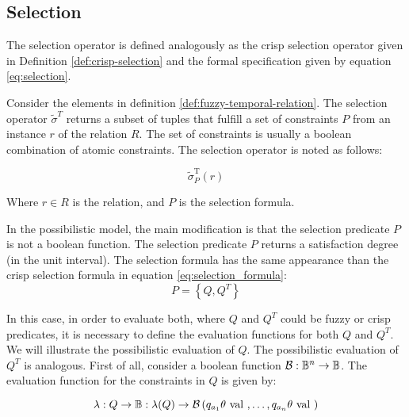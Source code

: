 \subsection{\label{subsection:fuzzy-selection}Selection}
The selection operator is defined analogously as the crisp selection operator given in Definition \ref{def:crisp-selection} and the formal specification given by equation \eqref{eq:selection}. 


\begin{definition}
\label{def:poss-selection}
 Consider the elements in definition \ref{def:fuzzy-temporal-relation}.
The selection operator $\tilde\sigma^{T}$ returns a subset of tuples that fulfill a set of constraints $P$ from an instance $r$ of the relation $R$. The set of constraints is usually a boolean combination of atomic constraints. The selection operator is noted as follows:
\end{definition}

\begin{equation}
 \label{eq:poss-selection}
\tilde\sigma^{\mbox{T}}_{P} \left( r \right)
\end{equation}

Where $r \in R$ is the relation, and $P$ is the selection formula. 


In the possibilistic model, the main modification is that the selection predicate $P$ is not a boolean function. The selection predicate $P$ returns a satisfaction degree (in the unit interval). 
The selection formula has the same appearance than the crisp selection formula in equation \eqref{eq:selection_formula}:
\begin{equation}
 \label{eq:fuzzy-selection_formula}
P = \left \lbrace Q, Q^{T}\right \rbrace
\end{equation}

In this case, in order to evaluate both, where  $Q$ and $Q^{T}$ could be fuzzy or crisp predicates, it is necessary to define the evaluation functions for both $Q$ and $Q^{T}$. We will illustrate the possibilistic evaluation of $Q$. The possibilistic evaluation of $Q^T$ is analogous. First of all, consider a boolean function $\operatorname*{\mathcal{B}}:\mathbb{B}^{n}  \rightarrow \mathbb{B}$. The evaluation function for the constraints in $Q$  is given by:

\begin{equation}
 \label{eq:evaluation-function}
\lambda : Q \rightarrow \mathbb{B} : \lambda (Q) \rightarrow \operatorname*{\mathcal{B}} \left(q_{a_1}  \theta \mbox{ val }, \ldots, q_{a_n}  \theta \mbox{ val } \right)
\end{equation}

